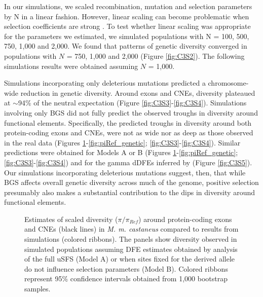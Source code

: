 	In our simulations, we scaled recombination, mutation and selection parameters by N in a linear fashion. However, linear scaling can become problematic when selection coefficients are strong \citep{RN198}. To test whether linear scaling was appropriate for the parameters we estimated, we simulated populations with N = 100, 500, 750, 1,000 and 2,000. We found that patterns of genetic diversity converged in populations with $N$ = 750, 1,000 and 2,000 (Figure \ref{fig:C3S2}). The following simulations results were obtained assuming $N$ = 1,000. 


	Simulations incorporating only deleterious mutations predicted a chromosome-wide reduction in genetic diversity. Around exons and CNEs, diversity plateaued at $\sim$94\% of the neutral expectation (Figure \ref{fig:C3S3}-\ref{fig:C3S4}). Simulations involving only BGS did not fully predict the observed troughs in diversity around functional elements. Specifically, the predicted troughs in diversity around both protein-coding exons and CNEs, were not as wide nor as deep as those observed in the real data (Figures \ref{fig:piRef_physical}-\ref{fig:piRef_genetic}; \ref{fig:C3S3}-\ref{fig:C3S4}). Similar predictions were obtained for Models A or B (Figures \ref{fig:piRef_physical}-\ref{fig:piRef_genetic}; \ref{fig:C3S3}-\ref{fig:C3S4}) and for the gamma dDFEs inferred by \cite{RN122} (Figure \ref{fig:C3S5}). Our simulations incorporating deleterious mutations suggest, then, that while BGS affects overall genetic diversity across much of the genome, positive selection presumably also makes a substantial contribution to the dips in diversity around functional elements.
	
 \begin{figure}[H]
   \centering      
   \noindent{}
 \caption[Reductions in diversity caused by background selection and selective sweeps in simulated data - physical distance]{Estimates of scaled diversity ($\pi / \pi_{Ref}$) around protein-coding exons and CNEs (black lines) in \textit{M. m. castaneus} compared to results from simulations (colored ribbons). The panels show diversity observed in simulated populations assuming DFE estimates obtained by analysis of the full uSFS (Model A) or when sites fixed for the derived allele do not influence selection parameters (Model B). Colored ribbons represent 95\% confidence intervals obtained from 1,000 bootstrap samples.}
 \label{fig:piRef_physical}
\end{figure}

